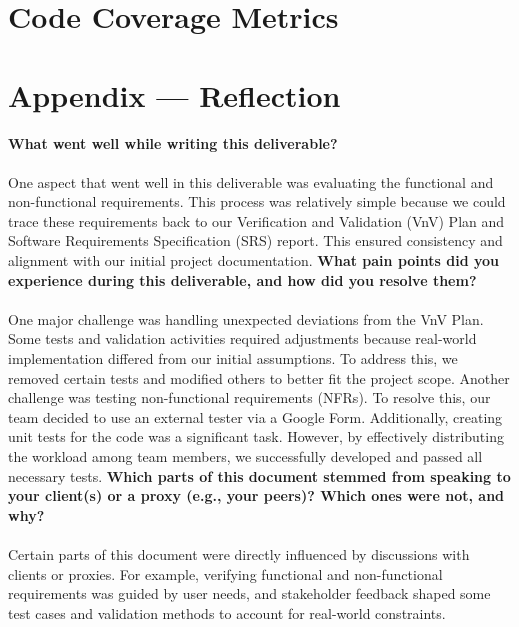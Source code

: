 \documentclass[12pt, titlepage]{article}
\begin{document}
\section{Code Coverage Metrics}






\newpage{}
\section*{Appendix --- Reflection}
  \textbf{What went well while writing this deliverable?} \\\\
  One aspect that went well in this deliverable was evaluating the functional and non-functional requirements. This process was relatively simple because we could trace these requirements back to our Verification and Validation (VnV) Plan and Software Requirements Specification (SRS) report. This ensured consistency and alignment with our initial project documentation.
  \newline \newline \textbf{What pain points did you experience during this deliverable, and how did you resolve them?} \\\\
  One major challenge was handling unexpected deviations from the VnV Plan. Some tests and validation activities required adjustments because real-world implementation differed from our initial assumptions. To address this, we removed certain tests and modified others to better fit the project scope. Another challenge was testing non-functional requirements (NFRs). To resolve this, our team decided to use an external tester via a Google Form. Additionally, creating unit tests for the code was a significant task. However, by effectively distributing the workload among team members, we successfully developed and passed all necessary tests.
  \newline  \newline \textbf{Which parts of this document stemmed from speaking to your client(s) or a proxy (e.g., your peers)? Which ones were not, and why?}  \\\\
  Certain parts of this document were directly influenced by discussions with clients or proxies. For example, verifying functional and non-functional requirements was guided by user needs, and stakeholder feedback shaped some test cases and validation methods to account for real-world constraints.
\end{document}
